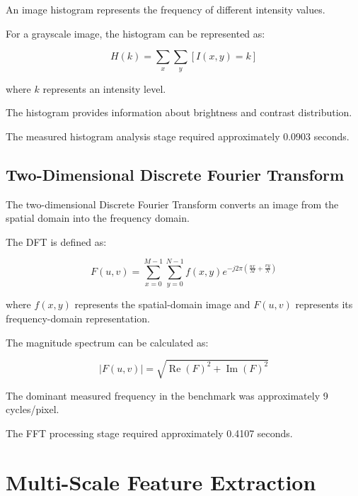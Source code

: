 \documentclass[11pt,a4paper]{article}
\begin{document}
An image histogram represents the frequency of different intensity values.

For a grayscale image, the histogram can be represented as:

\begin{equation}
H(k)=\sum_{x}\sum_{y}[I(x,y)=k]
\end{equation}

where $k$ represents an intensity level.

The histogram provides information about brightness and contrast distribution.

The measured histogram analysis stage required approximately 0.0903 seconds.


\subsection{Two-Dimensional Discrete Fourier Transform}

The two-dimensional Discrete Fourier Transform converts an image from the spatial domain into the frequency domain.

The DFT is defined as:

\begin{equation}
F(u,v)=
\sum_{x=0}^{M-1}
\sum_{y=0}^{N-1}
f(x,y)
e^{-j2\pi
\left(
\frac{ux}{M}+\frac{vy}{N}
\right)}
\end{equation}

where $f(x,y)$ represents the spatial-domain image and $F(u,v)$ represents its frequency-domain representation.

The magnitude spectrum can be calculated as:

\begin{equation}
|F(u,v)| =
\sqrt{
\operatorname{Re}(F)^2+
\operatorname{Im}(F)^2
}
\end{equation}

The dominant measured frequency in the benchmark was approximately 9 cycles/pixel.

The FFT processing stage required approximately 0.4107 seconds.


\section{Multi-Scale Feature Extraction}
\end{document}
